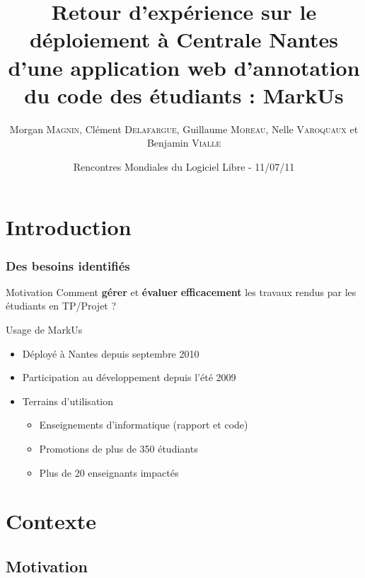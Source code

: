 \documentclass[hyperref,french,usenames,xcolor=dvipsnames]{beamer}
\title[REX MarkUs]%
{Retour d’expérience sur le déploiement à Centrale Nantes d’une application web d’annotation du code des étudiants : MarkUs}
\author[C. \textsc{Delafargue}, M. \textsc{Magnin}, G. \textsc{Moreau}, N. \textsc{Varoquaux}, B. \textsc{Vialle}]%
{Morgan \textsc{Magnin}, Clément \textsc{Delafargue}, Guillaume \textsc{Moreau}, Nelle \textsc{Varoquaux} et Benjamin \textsc{Vialle}
}
\institute[ECN]{
\structure{
École Centrale de Nantes}
}
\date[11/07/2011]{Rencontres Mondiales du Logiciel Libre - 11/07/11}
\begin{document}
\frame{\titlepage}


\section{Introduction}

\frame
{
  \frametitle{Des besoins identifiés}

\begin{alertblock}{Motivation}
Comment \textbf{gérer} et \textbf{évaluer} \textbf{efficacement} les travaux rendus par les étudiants en TP/Projet ?
\end{alertblock}

\begin{block}{Usage de MarkUs}
\begin{itemize}
\item Déployé à Nantes depuis septembre 2010
\item Participation au développement depuis l'été 2009
\item Terrains d'utilisation
\begin{itemize}
\item Enseignements d'informatique (rapport et code)
\item Promotions de plus de 350 étudiants
\item Plus de 20 enseignants impactés
\end{itemize}
\end{itemize}
\end{block}
}

\section{Contexte}

\subsection*{Motivation}
\end{document}
